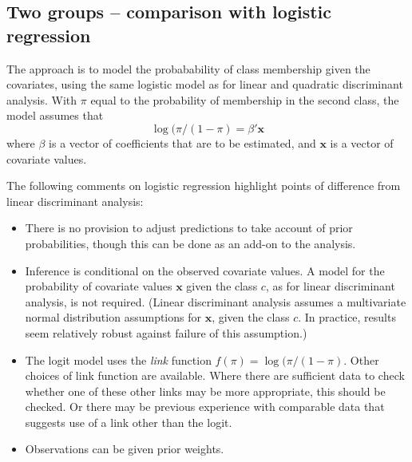 \subsection*{Two groups -- comparison with logistic regression}

The approach is to model the probabability of class membership given
the covariates, using the same logistic model as for linear and
quadratic discriminant analysis.  With $\pi$ equal to the probability
of membership in the second class, the model assumes that
\[ \log(\pi/(1-\pi) = \beta' \mathbf{x}\]
where $\beta$ is a vector of  coefficients that are to be estimated,
and $\mathbf{x}$ is a vector of covariate values.

The following comments on logistic regression
highlight points of difference from linear discriminant analysis:

\begin{itemize}
\item There is no provision to adjust predictions to take account of
prior probabilities, though this can be done as an add-on to the analysis.
\item Inference is conditional on the observed covariate values. A model
  for the probability of covariate values $\mathbf{x}$ given the class
  $c$, as for linear discriminant analysis, is not required.
  (Linear discriminant analysis assumes a multivariate normal distribution
  assumptions for $\mathbf{x}$, given the class $c$. In practice, results
  seem relatively robust against failure of this assumption.)
\item The logit model uses the {\em link} function $f(\pi) =
  \log(\pi/(1-\pi)$. Other choices of link function are available.
  Where there are sufficient data to check whether one of these other
  links may be more appropriate, this should be checked.  Or there may
  be previous experience with comparable data that suggests use of a
  link other than the logit.
\item Observations can be given prior weights.
\end{itemize}


